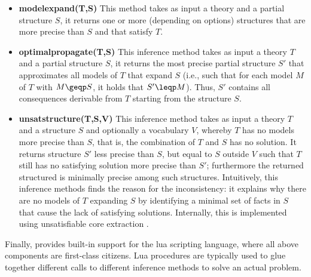 \begin{itemize}
 \item \textbf{modelexpand(T,S)} This method takes as input a theory and a partial structure $S$, it returns one or more (depending on options) structures that are more precise than $S$ and that satisfy $T$.
 \item \textbf{optimalpropagate(T,S)} This inference method takes as input a theory $T$ and a partial structure $S$, it returns the most precise partial structure $S'$ that approximates all models of $T$ that expand $S$ (i.e., such that for each model $M$ of $T$ with $M\geqp S$, it holds that $S'\leqp M$). Thus, $S'$ contains all consequences derivable from $T$ starting from the structure $S$.  
 \item \textbf{unsatstructure(T,S,V)} This inference method takes as input a theory $T$ and a structure $S$ and optionally a vocabulary $V$, whereby $T$ has no models more precise than  $S$, that is, the combination of $T$ and $S$ has no solution. It returns structure $S'$ less precise than $S$, but equal to $S$ outside $V$ such that $T$ still has no satisfying solution more precise than $S'$; furthermore the returned structured is minimally precise among such structures. Intuitively, this inference methods finds the reason for the inconsistency: it explains why there are no models of $T$ expanding $S$ by identifying a minimal set of facts in $S$ that cause the lack of satisfying solutions. 
 Internally, this is implemented using unsatisfiable core extraction \cite{conf/sat/LynceM04}. 
\end{itemize}
Finally, \idp provides built-in support for the lua scripting language, where all above components are first-class citizens. Lua procedures are typically used to glue together different calls to different inference methods to solve an actual problem.

